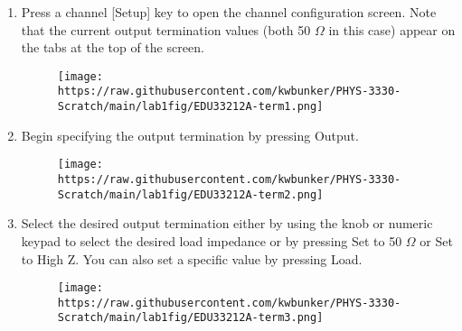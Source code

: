 \documentclass[
]{article}
\makeatletter
\newcounter{figno}
\newenvironment{fignos:no-prefix-figure-caption}{
  \caption@ifcompatibility{}{
    \let\oldthefigure\thefigure
    \let\oldtheHfigure\theHfigure
    \renewcommand{\thefigure}{figno:\thefigno}
    \renewcommand{\theHfigure}{figno:\thefigno}
    \stepcounter{figno}
    \captionsetup{labelformat=empty}
  }
}{
  \caption@ifcompatibility{}{
    \captionsetup{labelformat=default}
    \let\thefigure\oldthefigure
    \let\theHfigure\oldtheHfigure
    \addtocounter{figure}{-1}
  }
}
\makeatother
\begin{document}
\begin{enumerate}
\def\labelenumi{\arabic{enumi}.}
\item
  Press a channel {[}Setup{]} key to open the channel configuration
  screen. Note that the current output termination values (both 50
  \(\Omega\) in this case) appear on the tabs at the top of the screen.

  \begin{fignos:no-prefix-figure-caption}

  \begin{figure}
  \centering
  \texttt{[image: https://raw.githubusercontent.com/kwbunker/PHYS-3330-Scratch/main/lab1fig/EDU33212A-term1.png]}
  \caption{}
  \end{figure}

  \end{fignos:no-prefix-figure-caption}
\item
  Begin specifying the output termination by pressing Output.

  \begin{fignos:no-prefix-figure-caption}

  \begin{figure}
  \centering
  \texttt{[image: https://raw.githubusercontent.com/kwbunker/PHYS-3330-Scratch/main/lab1fig/EDU33212A-term2.png]}
  \caption{}
  \end{figure}

  \end{fignos:no-prefix-figure-caption}
\item
  Select the desired output termination either by using the knob or
  numeric keypad to select the desired load impedance or by pressing Set
  to 50 \(\Omega\) or Set to High Z. You can also set a specific value
  by pressing Load.

  \begin{fignos:no-prefix-figure-caption}

  \begin{figure}
  \centering
  \texttt{[image: https://raw.githubusercontent.com/kwbunker/PHYS-3330-Scratch/main/lab1fig/EDU33212A-term3.png]}
  \caption{}
  \end{figure}

  \end{fignos:no-prefix-figure-caption}
\end{enumerate}
\end{document}
